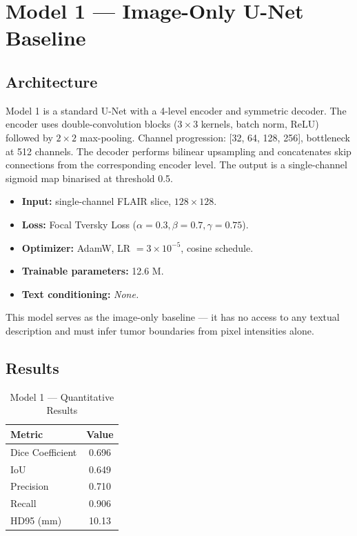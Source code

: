 \documentclass[12pt,a4paper]{article}
\begin{document}
\section{Model 1 — Image-Only U-Net Baseline}

\subsection{Architecture}
Model 1 is a standard U-Net with a 4-level encoder and symmetric decoder.
The encoder uses double-convolution blocks ($3\times3$ kernels, batch norm, ReLU)
followed by $2\times2$ max-pooling. Channel progression: [32, 64, 128, 256],
bottleneck at 512 channels. The decoder performs bilinear upsampling and
concatenates skip connections from the corresponding encoder level.
The output is a single-channel sigmoid map binarised at threshold 0.5.

\begin{itemize}
  \item \textbf{Input:} single-channel FLAIR slice, $128\times128$.
  \item \textbf{Loss:} Focal Tversky Loss ($\alpha=0.3, \beta=0.7, \gamma=0.75$).
  \item \textbf{Optimizer:} AdamW, LR $=3\times10^{-5}$, cosine schedule.
  \item \textbf{Trainable parameters:} 12.6 M.
  \item \textbf{Text conditioning:} \textit{None.}
\end{itemize}

This model serves as the image-only baseline — it has no access to any textual
description and must infer tumor boundaries from pixel intensities alone.

\subsection{Results}

\begin{table}[H]
\centering
\caption{Model 1 — Quantitative Results}
\begin{tabular}{lc}
\toprule
\textbf{Metric} & \textbf{Value} \\
\midrule
Dice Coefficient  & 0.696 \\
IoU               & 0.649 \\
Precision         & 0.710 \\
Recall            & 0.906 \\
HD95 (mm)         & 10.13 \\
\bottomrule
\end{tabular}
\label{tab:m1}
\end{table}
\end{document}
